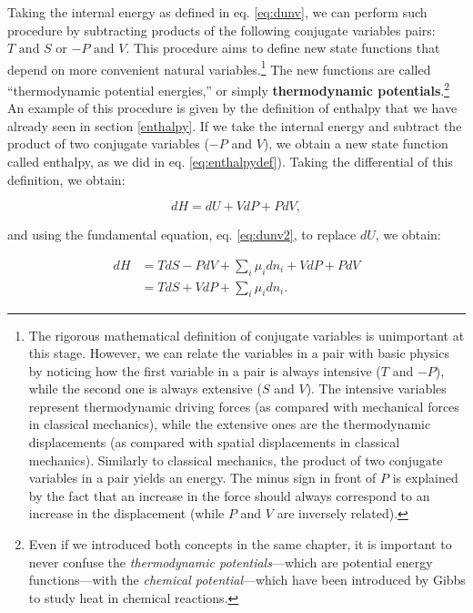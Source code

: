 \documentclass[
  9pt,
]{extbook}
\theoremstyle{definition}
\theoremstyle{definition}
\theoremstyle{definition}
\theoremstyle{remark}
\begin{document}
Taking the internal energy as defined in eq. \eqref{eq:dunv}, we can perform such procedure by subtracting products of the following conjugate variables pairs: \(T \text{ and } S\) or \(-P \text{ and } V\). This procedure aims to define new state functions that depend on more convenient natural variables.\footnote{The rigorous mathematical definition of conjugate variables is unimportant at this stage. However, we can relate the variables in a pair with basic physics by noticing how the first variable in a pair is always intensive (\(T\) and \(-P\)), while the second one is always extensive (\(S\) and \(V\)). The intensive variables represent thermodynamic driving forces (as compared with mechanical forces in classical mechanics), while the extensive ones are the thermodynamic displacements (as compared with spatial displacements in classical mechanics). Similarly to classical mechanics, the product of two conjugate variables in a pair yields an energy. The minus sign in front of \(P\) is explained by the fact that an increase in the force should always correspond to an increase in the displacement (while \(P\) and \(V\) are inversely related).} The new functions are called ``thermodynamic potential energies,'' or simply \textbf{thermodynamic potentials}.\footnote{Even if we introduced both concepts in the same chapter, it is important to never confuse the \emph{thermodynamic potentials}---which are potential energy functions---with the \emph{chemical potential}---which have been introduced by Gibbs to study heat in chemical reactions.} An example of this procedure is given by the definition of enthalpy that we have already seen in section \ref{enthalpy}. If we take the internal energy and subtract the product of two conjugate variables (\(-P\) and \(V\)), we obtain a new state function called enthalpy, as we did in eq. \eqref{eq:enthalpydef}). Taking the differential of this definition, we obtain:

\begin{equation}
dH = dU +VdP +PdV,
\label{eq:dhdef1}
\end{equation}

and using the fundamental equation, eq. \eqref{eq:dunv2}, to replace \(dU\), we obtain:

\begin{equation}
\begin{aligned}
dH & = TdS -PdV +\sum_i\mu_i dn_i +VdP +PdV  \\
   & = TdS +VdP +\sum_i\mu_i dn_i.
\end{aligned}
\label{eq:dhdef2}
\end{equation}
\end{document}
